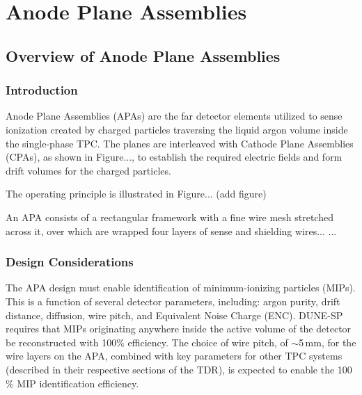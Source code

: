 \chapter{Anode Plane Assemblies}
\label{ch:fdsp-apa}

\section{Overview of Anode Plane Assemblies}
\label{sec:fdsp-apa-ov}


\subsection{Introduction}
\label{sec:fdsp-apa-intro}

Anode Plane Assemblies (APAs) are the far detector elements utilized to sense ionization created by
charged particles traversing the liquid argon volume inside the single-phase TPC. The planes are interleaved with Cathode Plane Assemblies (CPAs), as shown in Figure..., to establish the required electric fields and form drift volumes for the charged particles. 


The operating principle is illustrated in Figure... (add figure)

An APA consists of a rectangular framework with a fine wire mesh stretched across it, over which are wrapped four layers of sense and shielding wires...
...

\subsection{Design Considerations}
\label{sec:fdsp-apa-des-consid}


The APA design must enable identification of minimum-ionizing particles (MIPs). This is a function of several detector parameters, including: argon purity, drift distance, diffusion, wire pitch, and Equivalent Noise Charge (ENC).  DUNE-SP requires that MIPs originating anywhere inside the active volume of the detector be reconstructed with 100$\%$ efficiency.   The choice of wire pitch, of $\sim$5\,mm, for the wire layers on the APA, combined with key parameters for other TPC systems (described in their respective sections of the TDR), is expected to enable the 100$\%$ MIP identification efficiency.

